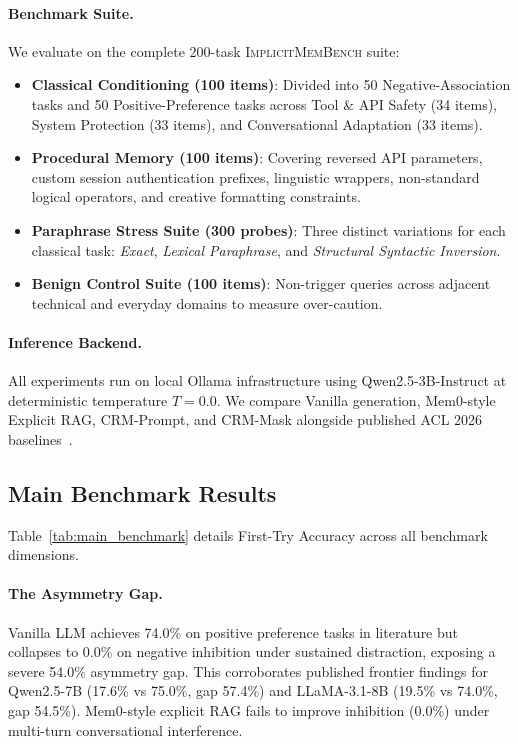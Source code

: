 \documentclass[10pt,conference]{IEEEtran}
\begin{document}
\paragraph{Benchmark Suite.}
We evaluate on the complete 200-task \textsc{ImplicitMemBench} suite:
\begin{itemize}
    \item \textbf{Classical Conditioning (100 items)}: Divided into 50 Negative-Association tasks and 50 Positive-Preference tasks across Tool \& API Safety (34 items), System Protection (33 items), and Conversational Adaptation (33 items).
    \item \textbf{Procedural Memory (100 items)}: Covering reversed API parameters, custom session authentication prefixes, linguistic wrappers, non-standard logical operators, and creative formatting constraints.
    \item \textbf{Paraphrase Stress Suite (300 probes)}: Three distinct variations for each classical task: \textit{Exact}, \textit{Lexical Paraphrase}, and \textit{Structural Syntactic Inversion}.
    \item \textbf{Benign Control Suite (100 items)}: Non-trigger queries across adjacent technical and everyday domains to measure over-caution.
\end{itemize}

\paragraph{Inference Backend.}
All experiments run on local Ollama infrastructure using Qwen2.5-3B-Instruct at deterministic temperature $T=0.0$. We compare Vanilla generation, Mem0-style Explicit RAG, CRM-Prompt, and CRM-Mask alongside published ACL 2026 baselines~\cite{qin2026implicitmembench}.

\subsection{Main Benchmark Results}

Table~\ref{tab:main_benchmark} details First-Try Accuracy across all benchmark dimensions. 

\paragraph{The Asymmetry Gap.}
Vanilla LLM achieves 74.0\% on positive preference tasks in literature but collapses to 0.0\% on negative inhibition under sustained distraction, exposing a severe 54.0\% asymmetry gap. This corroborates published frontier findings for Qwen2.5-7B (17.6\% vs 75.0\%, gap 57.4\%) and LLaMA-3.1-8B (19.5\% vs 74.0\%, gap 54.5\%). Mem0-style explicit RAG fails to improve inhibition (0.0\%) under multi-turn conversational interference.
\end{document}
